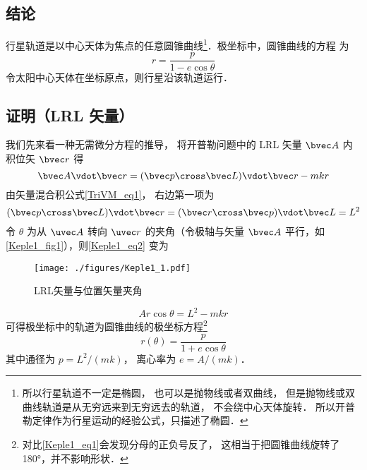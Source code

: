 

\subsection{结论}
行星轨道是以中心天体为焦点的任意圆锥曲线\footnote{所以行星轨道不一定是椭圆， 也可以是抛物线或者双曲线， 但是抛物线或双曲线轨道是从无穷远来到无穷远去的轨道， 不会绕中心天体旋转． 所以开普勒定律作为行星运动的经验公式，只描述了椭圆．}．极坐标中，圆锥曲线的方程
为
\begin{equation}\label{Keple1_eq1}
r = \frac{p}{1 - e \cos \theta }
\end{equation}
令太阳中心天体在坐标原点，则行星沿该轨道运行．

\subsection{证明（LRL 矢量）}

我们先来看一种无需微分方程的推导， 将开普勒问题中的 LRL 矢量 $\bvec A$ 内积位矢 $\bvec r$ 得
\begin{equation}\label{Keple1_eq2}
\bvec A \vdot \bvec r = (\bvec p \cross \bvec L)\vdot \bvec r - mkr
\end{equation}
由矢量混合积公式\autoref{TriVM_eq1}， 右边第一项为
\begin{equation}
(\bvec p \cross \bvec L)\vdot \bvec r = (\bvec r \cross \bvec p)\vdot \bvec L = L^2
\end{equation}
令 $\theta$ 为从 $\uvec A$ 转向 $\uvec r$ 的夹角（令极轴与矢量 $\bvec A$ 平行，如\autoref{Keple1_fig1}），则\autoref{Keple1_eq2} 变为
\begin{figure}[ht]
\centering
\texttt{[image: ./figures/Keple1\_1.pdf]}
\caption{LRL矢量与位置矢量夹角} \label{Keple1_fig1}
\end{figure}
\begin{equation}
Ar\cos\theta = L^2 - mkr
\end{equation}
可得极坐标中的轨道为圆锥曲线的极坐标方程\footnote{对比\autoref{Keple1_eq1}会发现分母的正负号反了， 这相当于把圆锥曲线旋转了 180°，并不影响形状．}
\begin{equation}
r(\theta) = \frac{p}{1 + e\cos\theta}
\end{equation}
其中通径为 $p = L^2/(mk)$， 离心率为 $e = A/(mk)$．

